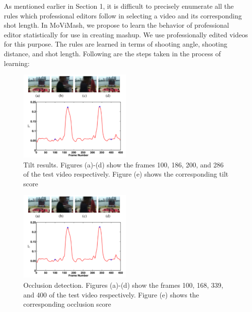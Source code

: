 \documentclass{new}
\begin{document}
As mentioned earlier in Section 1, it is difficult to precisely enumerate all the rules which professional editors follow in selecting
a video and its corresponding shot length. In MoViMash, we propose to learn the behavior of professional editor statistically for use
in creating mashup. We use professionally edited videos for this
purpose. The rules are learned in terms of shooting angle, shooting distance, and shot length. Following are the steps taken in the
process of learning:
\begin{figure}[h]
    \centering
    \includegraphics[width=0.5\textwidth]{img3.png}
    \caption{Tilt results. Figures (a)-(d) show the frames 100, 186,
200, and 286 of the test video respectively. Figure (e) shows the
corresponding tilt score}
    \label{fig:mesh4}
\end{figure}
\begin{figure}[h]
    \centering
    \includegraphics[width=0.5\textwidth]{img3.png}
    \caption{Occlusion detection. Figures (a)-(d) show the frames
100, 168, 339, and 400 of the test video respectively. Figure (e)
shows the corresponding occlusion score}
    \label{fig:mesh3}
\end{figure}
\end{document}
